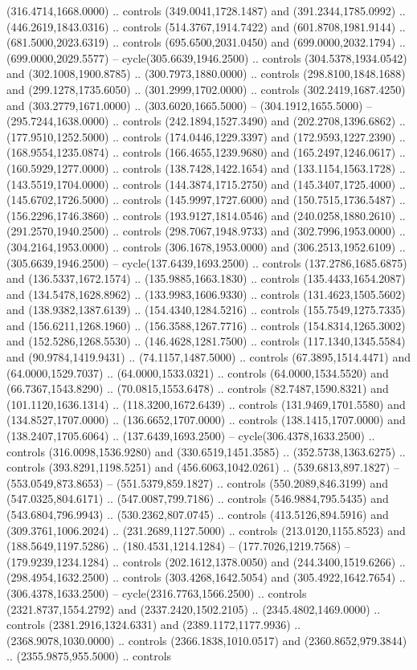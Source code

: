 (316.4714,1668.0000) .. controls (349.0041,1728.1487) and (391.2344,1785.0992) .. (446.2619,1843.0316) .. controls (514.3767,1914.7422) and (601.8708,1981.9144) .. (681.5000,2023.6319) .. controls (695.6500,2031.0450) and (699.0000,2032.1794) .. (699.0000,2029.5577) -- cycle(305.6639,1946.2500) .. controls (304.5378,1934.0542) and (302.1008,1900.8785) .. (300.7973,1880.0000) .. controls (298.8100,1848.1688) and (299.1278,1735.6050) .. (301.2999,1702.0000) .. controls (302.2419,1687.4250) and (303.2779,1671.0000) .. (303.6020,1665.5000) -- (304.1912,1655.5000) -- (295.7244,1638.0000) .. controls (242.1894,1527.3490) and (202.2708,1396.6862) .. (177.9510,1252.5000) .. controls (174.0446,1229.3397) and (172.9593,1227.2390) .. (168.9554,1235.0874) .. controls (166.4655,1239.9680) and (165.2497,1246.0617) .. (160.5929,1277.0000) .. controls (138.7428,1422.1654) and (133.1154,1563.1728) .. (143.5519,1704.0000) .. controls (144.3874,1715.2750) and (145.3407,1725.4000) .. (145.6702,1726.5000) .. controls (145.9997,1727.6000) and (150.7515,1736.5487) .. (156.2296,1746.3860) .. controls (193.9127,1814.0546) and (240.0258,1880.2610) .. (291.2570,1940.2500) .. controls (298.7067,1948.9733) and (302.7996,1953.0000) .. (304.2164,1953.0000) .. controls (306.1678,1953.0000) and (306.2513,1952.6109) .. (305.6639,1946.2500) -- cycle(137.6439,1693.2500) .. controls (137.2786,1685.6875) and (136.5337,1672.1574) .. (135.9885,1663.1830) .. controls (135.4433,1654.2087) and (134.5478,1628.8962) .. (133.9983,1606.9330) .. controls (131.4623,1505.5602) and (138.9382,1387.6139) .. (154.4340,1284.5216) .. controls (155.7549,1275.7335) and (156.6211,1268.1960) .. (156.3588,1267.7716) .. controls (154.8314,1265.3002) and (152.5286,1268.5530) .. (146.4628,1281.7500) .. controls (117.1340,1345.5584) and (90.9784,1419.9431) .. (74.1157,1487.5000) .. controls (67.3895,1514.4471) and (64.0000,1529.7037) .. (64.0000,1533.0321) .. controls (64.0000,1534.5520) and (66.7367,1543.8290) .. (70.0815,1553.6478) .. controls (82.7487,1590.8321) and (101.1120,1636.1314) .. (118.3200,1672.6439) .. controls (131.9469,1701.5580) and (134.8527,1707.0000) .. (136.6652,1707.0000) .. controls (138.1415,1707.0000) and (138.2407,1705.6064) .. (137.6439,1693.2500) -- cycle(306.4378,1633.2500) .. controls (316.0098,1536.9280) and (330.6519,1451.3585) .. (352.5738,1363.6275) .. controls (393.8291,1198.5251) and (456.6063,1042.0261) .. (539.6813,897.1827) -- (553.0549,873.8653) -- (551.5379,859.1827) .. controls (550.2089,846.3199) and (547.0325,804.6171) .. (547.0087,799.7186) .. controls (546.9884,795.5435) and (543.6804,796.9943) .. (530.2362,807.0745) .. controls (413.5126,894.5916) and (309.3761,1006.2024) .. (231.2689,1127.5000) .. controls (213.0120,1155.8523) and (188.5649,1197.5286) .. (180.4531,1214.1284) -- (177.7026,1219.7568) -- (179.9239,1234.1284) .. controls (202.1612,1378.0050) and (244.3400,1519.6266) .. (298.4954,1632.2500) .. controls (303.4268,1642.5054) and (305.4922,1642.7654) .. (306.4378,1633.2500) -- cycle(2316.7763,1566.2500) .. controls (2321.8737,1554.2792) and (2337.2420,1502.2105) .. (2345.4802,1469.0000) .. controls (2381.2916,1324.6331) and (2389.1172,1177.9936) .. (2368.9078,1030.0000) .. controls (2366.1838,1010.0517) and (2360.8652,979.3844) .. (2355.9875,955.5000) .. controls 
